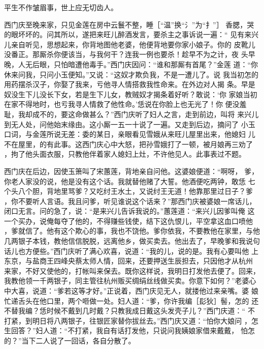 平生不作皱眉事，世上应无切齿人。

西门庆至晚来家，只见金莲在房中云鬟不整，睡［“温”换“氵”为“扌”］
香腮，哭的眼坏坏的。问其所以，遂把来旺儿醉酒发言，要杀主之事诉说一遍：“
见有来兴儿亲自听见，思想起来，你背地图他老婆，他便背地要你家小娘子。你的
皮靴儿没番正。那厮杀你便该当，与我何干？连我一例也要杀！趁早不为之计，夜
头早晚，人无后眼，只怕暗遭他毒手。”西门庆因问：“谁和那厮有首尾？”金莲
道：“你休来问我，只问小玉便知。”又说：“这奴才欺负我，不是一遭儿了。说
我当初怎的用药摆杀汉子，你娶了我来，亏他寻人情搭救我性命来。在外边对人揭
条。早是奴没生下儿没长下女，若是生下儿女，教贼奴才揭条着好听？敢说：‘你
家娘当初在家不得地时，也亏我寻人情救了他性命。’恁说在你脸上也无光了！你
便没羞耻，我却成不的，要这命做甚么？”西门庆听了妇人之言，走到前边，叫将
来兴儿到无人处，问他始末缘由。这小厮一五一十说了一遍。又走到后边，摘问了
小玉口词，与金莲所说无差：委的某日，亲眼看见雪娥从来旺儿屋里出来，他媳妇
儿不在屋里，的有此事。这西门庆心中大怒，把孙雪娥打了一顿，被月娘再三劝了
，拘了他头面衣服，只教他伴着家人媳妇上灶，不许他见人。此事表过不题。

西门庆在后边，因使玉箫叫了宋蕙莲，背地亲自问他。这婆娘便道：“啊呀，
爹，你老人家没的说，他是没有这个话。我就替他赌了大誓。他酒便吃两钟，敢恁
七个头八个胆，背地里骂爹？又吃纣王水土，又说纣王无道！他靠那里过日子？爹
，你不要听人言语。我且问爹，听见谁说这个话来？”那西门庆被婆娘一席话儿，
闭口无言。问的急了，说：“是来兴儿告诉我说的。”蕙莲道：“来兴儿因爹叫俺
这一个买办，说俺每夺了他的，不得赚些钱使，结下这仇恨儿，平空拿这血口喷他
，爹就信了。他有这个欺心的事，我也不饶他。爹你依我，不要教他在家里，与他
几两银子本钱，教他信信脱脱，远离他乡，做买卖去。他出去了，早晚爹和我说句
话儿也方便些。”西门庆听了满心欢喜，说道：“我的儿，说的是。我有心要叫他
上东京，与盐商王四峰央蔡太师人情，回来，还要押送生辰担去，只因他才从杭州
来家，不好又使他的，打帐叫来保去。既你这样说，我明日打发他去便了。回来，
我教他领一千两银子，同主管往杭州贩买绸绢丝线做买卖。你意下如何？”老婆心
中大喜，说道：“爹若这等才好。”正说着，西门庆见无人，就搂他过来亲嘴。婆
娘忙递舌头在他口里，两个咂做一处。妇人道：“爹，你许我编［髟狄］髻，怎的
还不替我编？恁时候不戴到几时戴？只教我成日戴这头发壳子儿？”西门庆道：“
不打紧，到明日将八两银子，往银匠家替你拔丝去。”西门庆又道：“怕你大娘问
，怎生回答？”妇人道：“不打紧，我自有话打发他，只说问我姨娘家借来戴戴，
怕怎的？”当下二人说了一回话，各自分散了。

